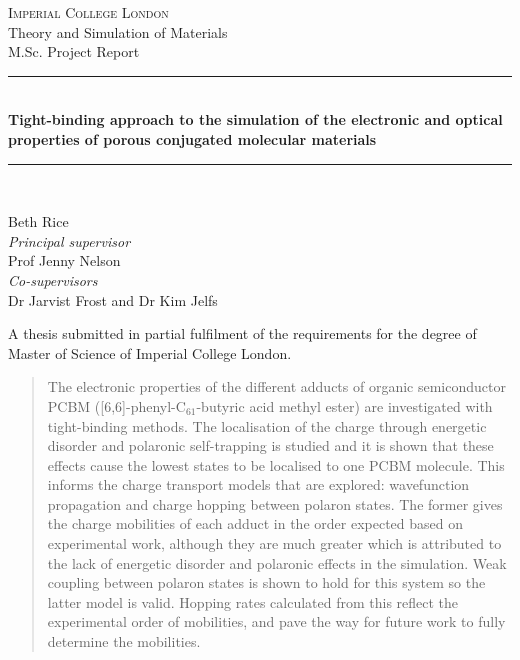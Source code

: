 \documentclass[a4paper,12pt]{article}
\newcommand{\HRule}{\rule{\linewidth}{0.5mm}}
\begin{document}
\begin{titlepage}
\begin{center}



\textsc{\LARGE Imperial College London}\\[1.5cm]
\centering
\huge Theory and Simulation of Materials\\
M.Sc. Project Report


\vspace{1.8cm}
\HRule \\[0.4cm]
{ \huge \bfseries Tight-binding approach to the simulation of the electronic and optical properties of porous conjugated molecular materials}\\[0.4cm]

\HRule \\[1.5cm]

\begin{minipage}{0.5\textwidth}
\begin{centering} \Huge
\vspace{1.5cm}
 Beth Rice\\\vspace{2cm}
\large
\emph{Principal supervisor} 
\\
Prof Jenny Nelson\\\vspace{0.5cm}
\emph{Co-supervisors}
\\
Dr Jarvist Frost and Dr Kim Jelfs\\\vspace{1.25cm}
\end{centering}
\end{minipage}
\small
\vfill
A thesis submitted in partial fulfilment of the requirements for the degree of Master of Science of Imperial College London.
\\

\end{center}
\end{titlepage}

\begin{abstract}
\noindent The electronic properties of the different adducts of organic semiconductor PCBM ([6,6]-phenyl-C$_{61}$-butyric acid methyl ester) are investigated with tight-binding methods. The localisation of the charge through energetic disorder and polaronic self-trapping is studied and it is shown that these effects cause the lowest states to be localised to one PCBM molecule. This informs the charge transport models that are explored: wavefunction propagation and charge hopping between polaron states. The former gives the charge mobilities of each adduct in the order expected based on experimental work, although they are much greater which is attributed to the lack of energetic disorder and polaronic effects in the simulation. Weak coupling between polaron states is shown to hold for this system so the latter model is valid. Hopping rates calculated from this reflect the experimental order of mobilities, and pave the way for future work to fully determine the mobilities. 

\end{abstract}
\end{document}
